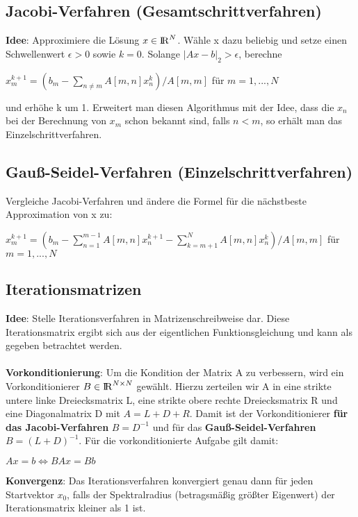 \documentclass[10pt,a4paper]{article}
\def\realnumbers{{\rm I\!R}}
\begin{document}
	\subsection{Jacobi-Verfahren (Gesamtschrittverfahren)}
	\textbf{Idee}: Approximiere die Lösung $x \in \realnumbers^N$. Wähle x dazu beliebig und setze einen Schwellenwert $\epsilon > 0$ sowie $k = 0$. Solange $|Ax - b|_2 > \epsilon$, berechne
	\begin{center}
		$x^{k+1}_m = (b_m - \sum_{n \neq m}^{} A[m, n]x_n^k) / A[m, m]$ für $m = 1, ..., N$
	\end{center}
	und erhöhe k um 1. Erweitert man diesen Algorithmus mit der Idee, dass die $x_n$ bei der Berechnung von $x_m$ schon bekannt sind, falls $n < m$, so erhält man das Einzelschrittverfahren.
	\subsection{Gauß-Seidel-Verfahren (Einzelschrittverfahren)}
	Vergleiche Jacobi-Verfahren und ändere die Formel für die nächstbeste Approximation von x zu:
	\begin{center}
		$x^{k+1}_m = (b_m - \sum_{n = 1}^{m - 1}A[m, n]x^{k+1}_n - \sum_{k = m + 1}^{N}A[m, n]x_n^k) / A[m, m]$ für $m = 1, ..., N$
	\end{center}
	
	\subsection{Iterationsmatrizen}
	\textbf{Idee}: Stelle Iterationsverfahren in Matrizenschreibweise dar. Diese Iterationsmatrix ergibt sich aus der eigentlichen Funktionsgleichung und kann als gegeben betrachtet werden.\\\\
	\textbf{Vorkonditionierung}: Um die Kondition der Matrix A zu verbessern, wird ein Vorkonditionierer $B \in \realnumbers^{N\times N}$ gewählt. Hierzu zerteilen wir A in eine strikte untere linke Dreiecksmatrix L, eine strikte obere rechte Dreiecksmatrix R und eine Diagonalmatrix D mit $A = L + D + R$. Damit ist der Vorkonditionierer \textbf{für das Jacobi-Verfahren} $B = D^{-1}$ und für das \textbf{Gauß-Seidel-Verfahren} $B = (L + D)^{-1}$. Für die vorkonditionierte Aufgabe gilt damit:
	\begin{center}
		$Ax = b \Leftrightarrow BAx = Bb$
	\end{center}
	\textbf{Konvergenz}: Das Iterationsverfahren konvergiert genau dann für jeden Startvektor $x_0$, falls der Spektralradius (betragsmäßig größter Eigenwert) der Iterationsmatrix kleiner als 1 ist.
	\newpage
\end{document}
